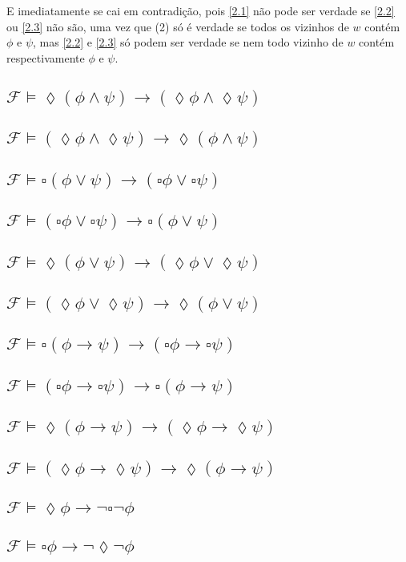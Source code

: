 \documentclass[11pt]{article}
\newcommand{\sq}{\square}
\newcommand{\di}{\lozenge}
\newcommand{\imp}{\rightarrow}
\newcommand{\F}{\mathcal{F}}
\begin{document}
E imediatamente se cai em contradição, pois \ref{2.1} não pode ser verdade se \ref{2.2} ou \ref{2.3} não são, uma vez que (2) só é verdade se todos os vizinhos de $w$ contém $\phi$ e $\psi$, mas \ref{2.2} e \ref{2.3} só podem ser verdade se nem todo vizinho de $w$ contém respectivamente $\phi$ e $\psi$.




\subsection{$ \F\models \di ( \phi \land \psi ) \imp ( \di \phi \land \di \psi ) $}
\subsection{$ \F\models ( \di \phi \land \di \psi ) \imp \di ( \phi \land \psi ) $}
\subsection{$ \F\models \sq ( \phi \lor \psi ) \imp ( \sq \phi \lor \sq \psi ) $}
\subsection{$ \F\models ( \sq \phi \lor \sq \psi ) \imp \sq ( \phi \lor \psi ) $}
\subsection{$ \F\models \di ( \phi \lor \psi ) \imp ( \di \phi \lor \di \psi ) $}
\subsection{$ \F\models ( \di \phi \lor \di \psi ) \imp \di ( \phi \lor \psi ) $}
\subsection{$ \F\models \sq ( \phi \imp \psi ) \imp ( \sq \phi \imp \sq \psi ) $}
\subsection{$ \F\models ( \sq \phi \imp \sq \psi ) \imp \sq ( \phi \imp \psi ) $}
\subsection{$ \F\models \di ( \phi \imp \psi ) \imp ( \di \phi \imp \di \psi ) $}
\subsection{$ \F\models ( \di \phi \imp \di \psi ) \imp \di ( \phi \imp \psi ) $}
\subsection{$ \F\models \di \phi \imp \lnot \sq \lnot \phi $}
\subsection{$ \F\models \sq \phi \imp \lnot \di \lnot \phi $}
\end{document}
